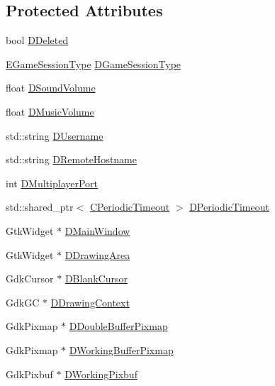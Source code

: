 \subsection*{Protected Attributes}
\begin{DoxyCompactItemize}
\item 
bool \hyperlink{classCApplicationData_a0a8651f95f3d48befd6e02a286ecdc82}{D\+Deleted}
\item 
\hyperlink{classCApplicationData_a0ec00515bf6b4b469b43ad62d615e3fa}{E\+Game\+Session\+Type} \hyperlink{classCApplicationData_acd2cc6f5bbb325532c21afc38241c3de}{D\+Game\+Session\+Type}
\item 
float \hyperlink{classCApplicationData_aa6e540f860dcb1929ef36ddce3be3691}{D\+Sound\+Volume}
\item 
float \hyperlink{classCApplicationData_a8bc61af4a83a667102e55cca2a739c3b}{D\+Music\+Volume}
\item 
std\+::string \hyperlink{classCApplicationData_aedfdb512317e5b62d0bbbcddcd48dfb8}{D\+Username}
\item 
std\+::string \hyperlink{classCApplicationData_a09da79011ab5ce6d6108d1c20f0e7c69}{D\+Remote\+Hostname}
\item 
int \hyperlink{classCApplicationData_a99bed2c18513304de1cf2a2344bf091f}{D\+Multiplayer\+Port}
\item 
std\+::shared\+\_\+ptr$<$ \hyperlink{classCPeriodicTimeout}{C\+Periodic\+Timeout} $>$ \hyperlink{classCApplicationData_a0265cb7aba9f099faed2a1c8ee588d33}{D\+Periodic\+Timeout}
\item 
Gtk\+Widget $\ast$ \hyperlink{classCApplicationData_af3c57a84b4ecca8a7f86b67a0ae55372}{D\+Main\+Window}
\item 
Gtk\+Widget $\ast$ \hyperlink{classCApplicationData_a4735f5d31632313e0b2a1659eb178987}{D\+Drawing\+Area}
\item 
Gdk\+Cursor $\ast$ \hyperlink{classCApplicationData_a34b9a8bb2c85704fb4bd07209acdcdc4}{D\+Blank\+Cursor}
\item 
Gdk\+GC $\ast$ \hyperlink{classCApplicationData_aa6c5bea9bdcc64398e5a3f693661d37c}{D\+Drawing\+Context}
\item 
Gdk\+Pixmap $\ast$ \hyperlink{classCApplicationData_aefb64ec5ca3f791f6d431cfc56b9f3b3}{D\+Double\+Buffer\+Pixmap}
\item 
Gdk\+Pixmap $\ast$ \hyperlink{classCApplicationData_afa34cf2780f38dd28c0c811e69d60a97}{D\+Working\+Buffer\+Pixmap}
\item 
Gdk\+Pixbuf $\ast$ \hyperlink{classCApplicationData_a19355c8cf25f216019db728219185119}{D\+Working\+Pixbuf}

\end{DoxyCompactItemize}
